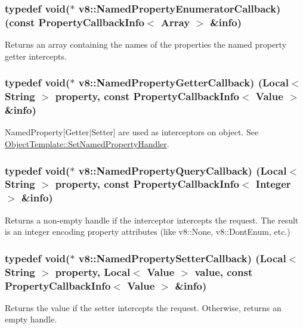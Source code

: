\subsubsection[{Named\+Property\+Enumerator\+Callback}]{\setlength{\rightskip}{0pt plus 5cm}typedef void($\ast$ v8\+::\+Named\+Property\+Enumerator\+Callback) (const {\bf Property\+Callback\+Info}$<$ {\bf Array} $>$ \&info)}\label{namespacev8_a5f6f16818a9cddacadbfe6d90ca3a6b1}
Returns an array containing the names of the properties the named property getter intercepts. \hypertarget{namespacev8_a50cae386a68bf9ff23d02aa1161face4}{}
\subsubsection[{Named\+Property\+Getter\+Callback}]{\setlength{\rightskip}{0pt plus 5cm}typedef void($\ast$ v8\+::\+Named\+Property\+Getter\+Callback) ({\bf Local}$<$ {\bf String} $>$ property, const {\bf Property\+Callback\+Info}$<$ {\bf Value} $>$ \&info)}\label{namespacev8_a50cae386a68bf9ff23d02aa1161face4}
Named\+Property\mbox{[}Getter$\vert$\+Setter\mbox{]} are used as interceptors on object. See \hyperlink{classv8_1_1ObjectTemplate_ac7bcbb6e2936ab38490680f7e1bfb787}{Object\+Template\+::\+Set\+Named\+Property\+Handler}. \hypertarget{namespacev8_ac135beae5f0c8b290255accb438f990e}{}
\subsubsection[{Named\+Property\+Query\+Callback}]{\setlength{\rightskip}{0pt plus 5cm}typedef void($\ast$ v8\+::\+Named\+Property\+Query\+Callback) ({\bf Local}$<$ {\bf String} $>$ property, const {\bf Property\+Callback\+Info}$<$ {\bf Integer} $>$ \&info)}\label{namespacev8_ac135beae5f0c8b290255accb438f990e}
Returns a non-\/empty handle if the interceptor intercepts the request. The result is an integer encoding property attributes (like v8\+::\+None, v8\+::\+Dont\+Enum, etc.) \hypertarget{namespacev8_a9587769513971dc7cb301b740d9e66b6}{}
\subsubsection[{Named\+Property\+Setter\+Callback}]{\setlength{\rightskip}{0pt plus 5cm}typedef void($\ast$ v8\+::\+Named\+Property\+Setter\+Callback) ({\bf Local}$<$ {\bf String} $>$ property, {\bf Local}$<$ {\bf Value} $>$ value, const {\bf Property\+Callback\+Info}$<$ {\bf Value} $>$ \&info)}\label{namespacev8_a9587769513971dc7cb301b740d9e66b6}
Returns the value if the setter intercepts the request. Otherwise, returns an empty handle. \hypertarget{namespacev8_ab5cafda0c556bba990c660ce9c904e0d}{}
